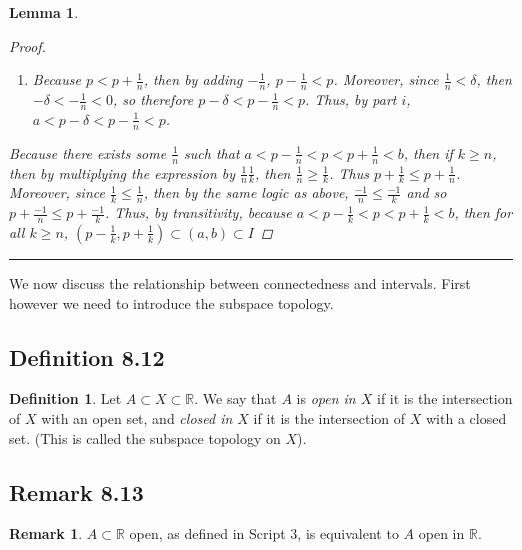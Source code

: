 \documentclass[openany, amssymb, psamsfonts]{amsart}
\newcommand{\bbR}{\mathbb{R}}
\newtheorem{lem}{Lemma}[section]
\theoremstyle{definition}
\newtheorem{defn}{Definition}[section]
\newtheorem{rem}{Remark}[section]
\numberwithin{equation}{section}
\begin{document}
\begin{lem}
\begin{enumerate}
\begin{proof}
\begin{enumerate}
    \item Because $p<p+\frac{1}{n}$, then by adding $-\frac{1}{n}$, $p-\frac{1}{n}<p$. Moreover, since $\frac{1}{n}<\delta$, then $-\delta<-\frac{1}{n}<0$, so therefore $p-\delta<p-\frac{1}{n}<p$. Thus, by part $i$, $a<p-\delta<p-\frac{1}{n}<p$. 
\end{enumerate} 
Because there exists some $\frac{1}{n}$ such that $a<p-\frac{1}{n}<p<p+\frac{1}{n}<b$, then if $k\geq n$, then by multiplying the expression by $\frac{1}{n}\frac{1}{k}$, then $\frac{1}{n}\geq \frac{1}{k}$. Thus $p+ \frac{1}{k}\leq p+\frac{1}{n}$. Moreover, since $\frac{1}{k}\leq \frac{1}{n}$, then by the same logic as above, $\frac{-1}{n}\leq \frac{-1}{k}$ and so $p+\frac{-1}{n}\leq p+\frac{-1}{k}$. Thus, by transitivity, because $a<p-\frac{1}{k}<p<p+\frac{1}{k}<b$, then for all $k\geq n$, $(p-\frac{1}{k}, p+ \frac{1}{k}) \subset (a,b) \subset I$
\end{proof}\vspace{4pt}     \hrule   \vspace{4pt} 
\end{enumerate}
\end{lem}

We now discuss the relationship between connectedness and intervals. First however we need to introduce the subspace topology.

\subsection*{Definition 8.12}
\begin{defn} Let $A\subset X\subset \bbR$. 
\label{8.12}
We say that $A$ is {\em  open in $X$} 
if it is the intersection of $X$ with an open set,
and {\em closed in $X$} if it is the intersection of $X$ with a closed set. (This is called the subspace topology on $X$).
\end{defn}

\subsection*{Remark 8.13}
\begin{rem}\label{8.13}
$A\subset \bbR$ open, as defined in Script 3, is equivalent to $A$  open in $\bbR$.
\end{rem}
\end{document}
